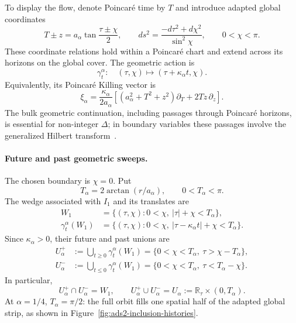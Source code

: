 \documentclass[a4paper,11pt]{article}
\theoremstyle{definition}
\begin{document}
To display the flow, denote Poincar\'e time by $T$ and introduce
adapted global coordinates
\begin{equation}
 T\pm z=a_\alpha\tan\frac{\tau\pm\chi}{2},
 \qquad
 ds^2=\frac{-d\tau^2+d\chi^2}{\sin^2\chi},
 \qquad 0<\chi<\pi .
 \label{eq:ads2-history-coordinates}
\end{equation}
These coordinate relations hold within a Poincar\'e chart and extend
across its horizons on the global cover. The geometric action is
\begin{equation}
 \gamma_t^\alpha:\quad
 (\tau,\chi)\longmapsto(\tau+\kappa_\alpha t,\chi).
 \label{eq:ads2-history-global-flow}
\end{equation}
Equivalently, its Poincar\'e Killing vector is
\begin{equation}
 \xi_\alpha=
 \frac{\kappa_\alpha}{2a_\alpha}
 \left[
 (a_\alpha^2+T^2+z^2)\partial_T+2Tz\,\partial_z
 \right].
\end{equation}
The bulk geometric continuation, including passages through Poincar\'e
horizons, is essential for non-integer $\Delta$; in boundary variables
these passages involve the generalized Hilbert
transform~\cite{LashkariLeungMoosaOuseph2025}.

\paragraph{Future and past geometric sweeps.}
The chosen boundary is $\chi=0$. Put
\begin{equation}
 T_\alpha=2\arctan(r/a_\alpha),
 \qquad 0<T_\alpha<\pi .
\end{equation}
The wedge associated with $I_1$ and its translates are
\begin{equation}
 \begin{aligned}
 W_1&=\{(\tau,\chi):0<\chi,\ |\tau|+\chi<T_\alpha\},\\
 \gamma_t^\alpha(W_1)
 &=\{(\tau,\chi):0<\chi,
       \ |\tau-\kappa_\alpha t|+\chi<T_\alpha\}.
 \end{aligned}
\end{equation}
Since $\kappa_\alpha>0$, their future and past unions are
\begin{equation}
 \begin{aligned}
 U_\alpha^+
 &:=\bigcup_{t\ge0}\gamma_t^\alpha(W_1)
   =\{0<\chi<T_\alpha,\ \tau>\chi-T_\alpha\},\\
 U_\alpha^-
 &:=\bigcup_{t\le0}\gamma_t^\alpha(W_1)
   =\{0<\chi<T_\alpha,\ \tau<T_\alpha-\chi\}.
 \end{aligned}
 \label{eq:ads2-history-sweeps}
\end{equation}
In particular,
\begin{equation}
 U_\alpha^+\cap U_\alpha^-=W_1,
 \qquad
 U_\alpha^+\cup U_\alpha^-
 =U_\alpha:=\mathbb R_\tau\times(0,T_\alpha).
 \label{eq:ads2-history-union}
\end{equation}
At $\alpha=1/4$, $T_\alpha=\pi/2$: the full orbit fills one spatial
half of the adapted global strip, as shown in
Figure~\ref{fig:ads2-inclusion-histories}.
\end{document}
